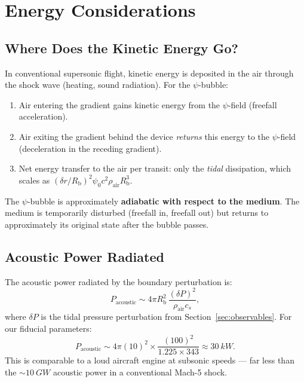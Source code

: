 \documentclass[12pt, letterpaper]{article}
\theoremstyle{definition}
\theoremstyle{remark}
\newcommand{\Rbub}{R_{\mathrm{b}}}
\newcommand{\cs}{c_s}
\begin{document}
\section{Energy Considerations}
\label{sec:energy}

\subsection{Where Does the Kinetic Energy Go?}

In conventional supersonic flight, kinetic energy is deposited in the air
through the shock wave (heating, sound radiation). For the $\psi$-bubble:

\begin{enumerate}
\item Air entering the gradient gains kinetic energy from the $\psi$-field
(freefall acceleration).
\item Air exiting the gradient behind the device \emph{returns} this energy
to the $\psi$-field (deceleration in the receding gradient).
\item Net energy transfer to the air per transit: only the \emph{tidal}
dissipation, which scales as $(\delta r / \Rbub)^2 \psi_0 c^2 \rho_{\mathrm{air}}
\Rbub^3$.
\end{enumerate}

The $\psi$-bubble is approximately \textbf{adiabatic with respect to the medium}.
The medium is temporarily disturbed (freefall in, freefall out) but returns to
approximately its original state after the bubble passes.

\subsection{Acoustic Power Radiated}

The acoustic power radiated by the boundary perturbation is:
\begin{equation}
P_{\mathrm{acoustic}} \sim 4\pi \Rbub^2 \,\frac{(\delta P)^2}{\rho_{\mathrm{air}} \cs},
\end{equation}
where $\delta P$ is the tidal pressure perturbation from Section~\ref{sec:observables}.
For our fiducial parameters:
\begin{equation}
P_{\mathrm{acoustic}} \sim 4\pi (10)^2 \times \frac{(100)^2}{1.225 \times 343}
\approx \SI{30}{kW}.
\end{equation}
This is comparable to a loud aircraft engine at subsonic speeds --- far less
than the $\sim \SI{10}{GW}$ acoustic power in a conventional Mach-5 shock.
\end{document}
